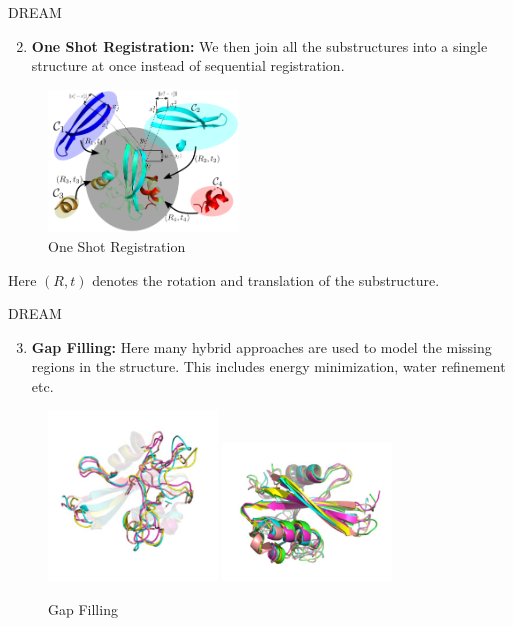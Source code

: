 \begin{frame}{DREAM}
    \begin{enumerate}
        \setcounter{enumi}{1}
        \item \textbf{One Shot Registration:} We then join all the substructures into a single structure at once instead of sequential registration.
    \end{enumerate}

    \pause 

    \begin{figure}[h]
        \centering
        \includegraphics[width=0.45\textwidth]{images/register.png}
        \caption{One Shot Registration}
        \label{fig:my_label}
    \end{figure}

    Here $(R,t)$ denotes the rotation and translation of the substructure.
\end{frame}

\begin{frame}{DREAM}
    \begin{enumerate}
        \setcounter{enumi}{2}
        \item \textbf{Gap Filling:} Here many hybrid approaches are used to model the missing regions in the structure. This includes energy minimization, water refinement etc. 
    \end{enumerate}

    \begin{figure}[h]
        \centering
        \includegraphics[width=0.4\textwidth]{images/gap1.png}
        \pause
        \includegraphics[width=0.4\textwidth]{images/gap2.png}
        \caption{Gap Filling}
        \label{fig:my_label}
    \end{figure}
\end{frame}

